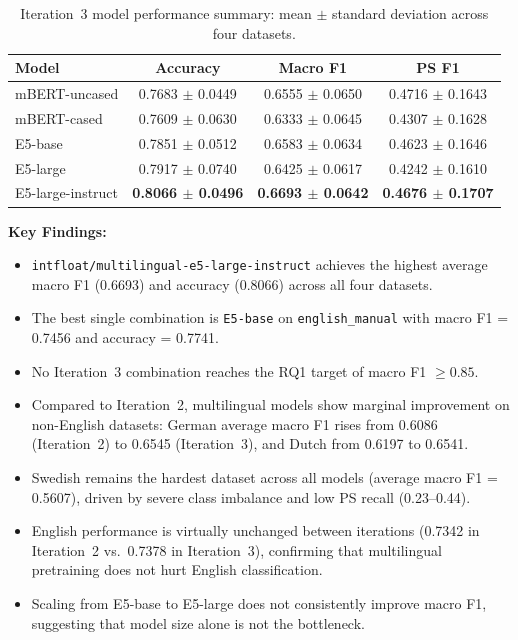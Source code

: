 \documentclass[11pt, titlepage, bibliography=totoc]{scrreprt}
\begin{document}
\begin{table}[htbp]
\centering
\caption{Iteration~3 model performance summary: mean $\pm$ standard deviation across four datasets.}
\label{tab:results-iter3-models}
\begin{tabular}{@{}lccc@{}}
\toprule
\textbf{Model} & \textbf{Accuracy} & \textbf{Macro F1} & \textbf{PS F1} \\
\midrule
mBERT-uncased       & 0.7683 $\pm$ 0.0449 & 0.6555 $\pm$ 0.0650 & 0.4716 $\pm$ 0.1643 \\
mBERT-cased         & 0.7609 $\pm$ 0.0630 & 0.6333 $\pm$ 0.0645 & 0.4307 $\pm$ 0.1628 \\
E5-base             & 0.7851 $\pm$ 0.0512 & 0.6583 $\pm$ 0.0634 & 0.4623 $\pm$ 0.1646 \\
E5-large            & 0.7917 $\pm$ 0.0740 & 0.6425 $\pm$ 0.0617 & 0.4242 $\pm$ 0.1610 \\
E5-large-instruct   & \textbf{0.8066 $\pm$ 0.0496} & \textbf{0.6693 $\pm$ 0.0642} & \textbf{0.4676 $\pm$ 0.1707} \\
\bottomrule
\end{tabular}
\end{table}

\textbf{Key Findings:}
\begin{itemize}
    \item \texttt{intfloat/multilingual-e5-large-instruct} achieves the highest average macro F1 (0.6693) and accuracy (0.8066) across all four datasets.
    \item The best single combination is \texttt{E5-base} on \texttt{english\_manual} with macro F1 = 0.7456 and accuracy = 0.7741.
    \item No Iteration~3 combination reaches the RQ1 target of macro F1 $\geq 0.85$.
    \item Compared to Iteration~2, multilingual models show marginal improvement on non-English datasets: German average macro F1 rises from 0.6086 (Iteration~2) to 0.6545 (Iteration~3), and Dutch from 0.6197 to 0.6541.
    \item Swedish remains the hardest dataset across all models (average macro F1 = 0.5607), driven by severe class imbalance and low PS recall (0.23--0.44).
    \item English performance is virtually unchanged between iterations (0.7342 in Iteration~2 vs.\ 0.7378 in Iteration~3), confirming that multilingual pretraining does not hurt English classification.
    \item Scaling from E5-base to E5-large does not consistently improve macro F1, suggesting that model size alone is not the bottleneck.
\end{itemize}
\end{document}

